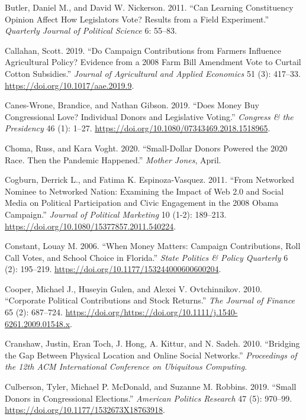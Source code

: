 \documentclass[12pt,]{article}
\begin{document}
\leavevmode\hypertarget{ref-butler2011}{}%
Butler, Daniel M., and David W. Nickerson. 2011. ``Can Learning
Constituency Opinion Affect How Legislators Vote? Results from a Field
Experiment.'' \emph{Quarterly Journal of Political Science} 6: 55--83.

\leavevmode\hypertarget{ref-callahan2019}{}%
Callahan, Scott. 2019. ``Do Campaign Contributions from Farmers
Influence Agricultural Policy? Evidence from a 2008 Farm Bill Amendment
Vote to Curtail Cotton Subsidies.'' \emph{Journal of Agricultural and
Applied Economics} 51 (3): 417--33.
\url{https://doi.org/10.1017/aae.2019.9}.

\leavevmode\hypertarget{ref-caneswrone2019}{}%
Canes-Wrone, Brandice, and Nathan Gibson. 2019. ``Does Money Buy
Congressional Love? Individual Donors and Legislative Voting.''
\emph{Congress \& the Presidency} 46 (1): 1--27.
\url{https://doi.org/10.1080/07343469.2018.1518965}.

\leavevmode\hypertarget{ref-choma2020}{}%
Choma, Russ, and Kara Voght. 2020. ``Small-Dollar Donors Powered the
2020 Race. Then the Pandemic Happened.'' \emph{Mother Jones}, April.

\leavevmode\hypertarget{ref-cogburn2011}{}%
Cogburn, Derrick L., and Fatima K. Espinoza-Vasquez. 2011. ``From
Networked Nominee to Networked Nation: Examining the Impact of Web 2.0
and Social Media on Political Participation and Civic Engagement in the
2008 Obama Campaign.'' \emph{Journal of Political Marketing} 10 (1-2):
189--213. \url{https://doi.org/10.1080/15377857.2011.540224}.

\leavevmode\hypertarget{ref-constant2006}{}%
Constant, Louay M. 2006. ``When Money Matters: Campaign Contributions,
Roll Call Votes, and School Choice in Florida.'' \emph{State Politics \&
Policy Quarterly} 6 (2): 195--219.
\url{https://doi.org/10.1177/153244000600600204}.

\leavevmode\hypertarget{ref-cooper2010}{}%
Cooper, Michael J., Huseyin Gulen, and Alexei V. Ovtchinnikov. 2010.
``Corporate Political Contributions and Stock Returns.'' \emph{The
Journal of Finance} 65 (2): 687--724.
\url{https://doi.org/https://doi.org/10.1111/j.1540-6261.2009.01548.x}.

\leavevmode\hypertarget{ref-cranshaw2010}{}%
Cranshaw, Justin, Eran Toch, J. Hong, A. Kittur, and N. Sadeh. 2010.
``Bridging the Gap Between Physical Location and Online Social
Networks.'' \emph{Proceedings of the 12th ACM International Conference
on Ubiquitous Computing}.

\leavevmode\hypertarget{ref-culberson2019}{}%
Culberson, Tyler, Michael P. McDonald, and Suzanne M. Robbins. 2019.
``Small Donors in Congressional Elections.'' \emph{American Politics
Research} 47 (5): 970--99.
\url{https://doi.org/10.1177/1532673X18763918}.
\end{document}
